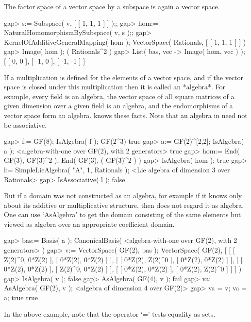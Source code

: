The factor space of a vector space by a subspace is again a vector
space.

\beginexample
    gap> s:= Subspace( v, [ [ 1, 1, 1 ] ] );;
    gap> hom:= NaturalHomomorphismBySubspace( v, s );;
    gap> KernelOfAdditiveGeneralMapping( hom );
    VectorSpace( Rationals, [ [ 1, 1, 1 ] ] )
    gap> Image( hom );
    ( Rationals^2 )
    gap> List( bas, vec -> Image( hom, vec ) );
    [ [ 0, 0 ], [ -1, 0 ], [ -1, -1 ] ]
\endexample


If a multiplication is defined for the elements of a vector space,
and if the vector space is closed under this multiplication then it is
called an *algebra*.
For example, every field is an algebra, the vector space of all
square matrices of a given dimension over a given field is an algebra,
and the endomorphisms of a vector space form an algebra.
{\GAP} knows these facts.
Note that an algebra in {\GAP} need not be associative.

\beginexample
    gap> f:= GF(8); IsAlgebra( f );
    GF(2^3)
    true
    gap> a:= GF(2)^[2,2]; IsAlgebra( a );
    <algebra-with-one over GF(2), with 2 generators>
    true
    gap> hom:= End( GF(3), GF(3)^2 );
    End( GF(3), ( GF(3)^2 ) )
    gap> IsAlgebra( hom );
    true
    gap> l:= SimpleLieAlgebra( "A", 1, Rationals );
    <Lie algebra of dimension 3 over Rationals>
    gap> IsAssociative( l );
    false
\endexample

But if a domain was not constructed as an algebra,
for example if it knows only about its additive or multiplicative
structure, then {\GAP} does not regard it as algebra.
One can use `AsAlgebra' to get the domain consisting of the same elements
but viewed as algebra over an appropriate coefficient domain.

\beginexample
    gap> bas:= Basis( a );
    CanonicalBasis( <algebra-with-one over GF(2), with 2 generators> )
    gap> v:= VectorSpace( GF(2), bas );
    VectorSpace( GF(2), [ [ [ Z(2)^0, 0*Z(2) ], [ 0*Z(2), 0*Z(2) ] ], 
      [ [ 0*Z(2), Z(2)^0 ], [ 0*Z(2), 0*Z(2) ] ], 
      [ [ 0*Z(2), 0*Z(2) ], [ Z(2)^0, 0*Z(2) ] ], 
      [ [ 0*Z(2), 0*Z(2) ], [ 0*Z(2), Z(2)^0 ] ] ] )
    gap> IsAlgebra( v );
    false
    gap> AsAlgebra( GF(4), v );
    fail
    gap> va:= AsAlgebra( GF(2), v );
    <algebra of dimension 4 over GF(2)>
    gap> va = v; va = a;
    true
    true
\endexample

In the above example, note that the operator `=' tests equality as sets.

